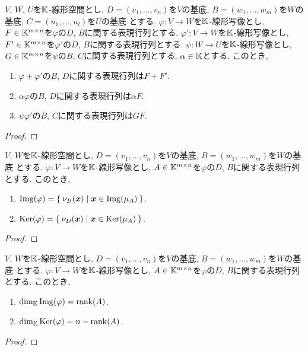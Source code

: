 \begin{prop}
  $V$, $W$, $U$を$\mathbb{K}$-線形空間とし,
  $D=(v_1,\ldots,v_n)$を$V$の基底,
  $B=(w_1,\ldots,w_m)$を$W$の基底,
  $C=(u_1,\ldots,u_l)$を$U$の基底
  とする.
  $\varphi\colon V\to W$を$\mathbb{K}$-線形写像とし,
  $F\in\mathbb{K}^{m\times n}$を$\varphi$の$D$, $B$に関する表現行列とする.
  $\varphi'\colon V\to W$を$\mathbb{K}$-線形写像とし,
  $F'\in\mathbb{K}^{m\times n}$を$\varphi'$の$D$, $B$に関する表現行列とする.
  $\psi\colon W\to U$を$\mathbb{K}$-線形写像とし,
  $G\in\mathbb{K}^{m\times n}$を$\psi$の$B$, $C$に関する表現行列とする.
  $\alpha\in \mathbb{K}$とする.
このとき,
\begin{enumerate}
  \item $\varphi+\varphi'$の$B$, $D$に関する表現行列は$F+F'$.
  \item $\alpha\varphi$の$B$, $D$に関する表現行列は$\alpha F$.
  \item $\psi\varphi'$の$B$, $C$に関する表現行列は$GF$.
\end{enumerate}
\end{prop}
\begin{proof}\end{proof}



\begin{prop}
  $V$, $W$を$\mathbb{K}$-線形空間とし,
  $D=(v_1,\ldots,v_n)$を$V$の基底,
  $B=(w_1,\ldots,w_m)$を$W$の基底
  とする.
  $\varphi\colon V\to W$を$\mathbb{K}$-線形写像とし,
  $A\in\mathbb{K}^{m\times n}$を$\varphi$の$D$, $B$に関する表現行列とする.
  このとき,
\begin{enumerate}
  \item $\operatorname{Img}(\varphi)=\Set{\nu_B(\boldsymbol{x}) |\boldsymbol{x}\in \operatorname{Img}(\mu_A)}$.
  \item $\operatorname{Ker}(\varphi)=\Set{\nu_D(\boldsymbol{x}) |\boldsymbol{x}\in \operatorname{Ker}(\mu_A)}$.
\end{enumerate}
\end{prop}
\begin{proof}\end{proof}

\begin{prop}
  $V$, $W$を$\mathbb{K}$-線形空間とし,
  $D=(v_1,\ldots,v_n)$を$V$の基底,
  $B=(w_1,\ldots,w_m)$を$W$の基底
  とする.
  $\varphi\colon V\to W$を$\mathbb{K}$-線形写像とし,
  $A\in\mathbb{K}^{m\times n}$を$\varphi$の$D$, $B$に関する表現行列とする.
  このとき,
\begin{enumerate}
  \item $\dim_{\mathbb{K}}\operatorname{Img}(\varphi)=\operatorname{rank}(A)$.
  \item $\dim_{\mathbb{K}}\operatorname{Ker}(\varphi)=n-\operatorname{rank}(A)$.
\end{enumerate}
\end{prop}
\begin{proof}\end{proof}

